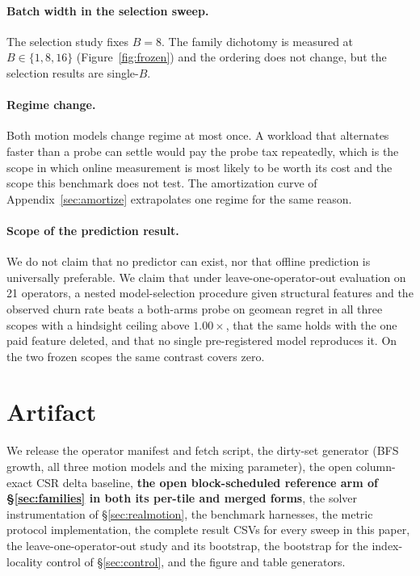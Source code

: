 \documentclass{article}
\begin{document}
\paragraph{Batch width in the selection sweep.} The selection study fixes $B{=}8$.
The family dichotomy is measured at $B\in\{1,8,16\}$ (Figure~\ref{fig:frozen})
and the ordering does not change, but the selection results are single-$B$.

\paragraph{Regime change.} Both motion models change regime at most once. A
workload that alternates faster than a probe can settle would pay the probe tax
repeatedly, which is the scope in which online measurement is most likely to be
worth its cost and the scope this benchmark does not test. The amortization
curve of Appendix~\ref{sec:amortize} extrapolates one regime for the same reason.

\paragraph{Scope of the prediction result.} We do not claim that no predictor can
exist, nor that offline prediction is universally preferable. We claim that under
leave-one-operator-out evaluation on 21 operators, a nested model-selection
procedure given structural features and the observed churn rate beats a
both-arms probe on geomean regret in all three scopes with a hindsight ceiling
above $1.00\times$, that the same holds with the one paid feature deleted, and
that no single pre-registered model reproduces it. On the two frozen scopes the
same contrast covers zero.

\section{Artifact}
\label{sec:artifact}

We release the operator manifest and fetch script, the dirty-set generator (BFS
growth, all three motion models and the mixing parameter), the open column-exact
CSR delta baseline, \textbf{the open block-scheduled reference arm of
\S\ref{sec:families} in both its per-tile and merged forms}, the solver
instrumentation of \S\ref{sec:realmotion}, the benchmark harnesses, the metric
protocol implementation, the complete result CSVs for every sweep in this paper,
the leave-one-operator-out study and its bootstrap, the bootstrap for the
index-locality control of \S\ref{sec:control}, and the figure and table
generators.
\end{document}
